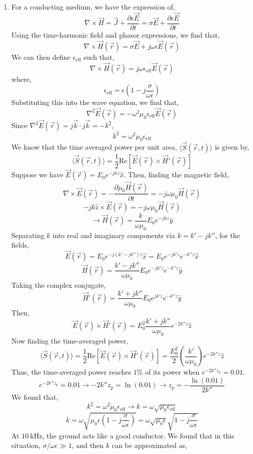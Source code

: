 \documentclass[12pt]{article}
\begin{document}
\begin{enumerate}
\begin{enumerate}
		\item [b.]
		For a conducting medium, we have the expression of,
		\[\nabla \times \vec H = \vec J + \frac{\partial \epsilon \vec E}{\partial t}=\sigma \vec E +\frac{\partial \epsilon \vec E}{\partial t}\]
		Using the time-harmonic field and phasor expressions, we find that,
		\[\nabla \times \vec H(\vec r) = \sigma \vec E + j\omega \epsilon \vec E(\vec r)\]
		We can then define $\epsilon_{\mathrm{eff}}$ such that,
		\[\nabla \times \vec H(\vec r) = j\omega \epsilon_{\mathrm{eff}}\vec E(\vec r)\]
		where,
		\[\epsilon_{\mathrm{eff}}=\epsilon\left(1-j\frac{\sigma}{\omega \epsilon}\right)\]
		Substituting this into the wave equation, we find that,
		\[\nabla^2 \vec E(\vec r)=-\omega^2\mu_0\epsilon_{\mathrm{eff}}\vec E(\vec r)\]
		Since $\nabla^2 \vec E(\vec r)=j\vec k \cdot j\vec k = -k^2$,
		\[k^2=\omega^2\mu_0\epsilon_{\mathrm{eff}}\]
		We know that the time averaged power per unit area, $\langle \vec S(\vec r, t)\rangle$ is given by,
		\[\langle \vec S(\vec r, t)\rangle = \frac{1}{2}\mathrm{Re}\left[\vec E(\vec r)\times \vec H'(\vec r)\right]\]
		Suppose we have $\vec E(\vec r)=E_0e^{-jkz}\hat x$.
		Then, finding the magnetic field,
		\[\nabla \times \vec E(\vec r) = -\frac{\partial \mu_0 \vec H(\vec r)}{\partial t}=-j\omega \mu_0 \vec H(\vec r)\]
		\[-jk\hat z \times \vec E(\vec r)=-j\omega \mu_0\vec H(\vec r)\]
		\[\to \vec H(\vec r)=\frac{k}{\omega \mu_0}E_0e^{-jkz}\hat y\]
		Separating $k$ into real and imaginary components via $k=k'-jk''$, for the fields,
		\[\vec E(\vec r)=E_0e^{-j(k'-jk'')z}\hat x=E_0e^{-jk'z}e^{-k''z}\hat x\]
		\[\vec H(\vec r)=\frac{k'-jk''}{\omega \mu_0}E_0e^{-jk'z}e^{-k''z}\hat y\]
		Taking the complex conjugate,
		\[\vec H'(\vec r)=\frac{k'+jk''}{\omega\mu_0}E_0e^{jk'z}e^{-k''z}\hat y\]
		Then,
		\[\vec E(\vec r)\times \vec H'(\vec r)=E_0^2\frac{k'+jk''}{\omega \mu_0}e^{-2k''z}\hat z\]
		Now finding the time-averaged power,
		\[\langle \vec S(\vec r,t )\rangle = \frac{1}{2}\mathrm{Re}\left[\vec E(\vec r)\times \vec H'(\vec r)\right]=\frac{E_0^2}{2}\left(\frac{k'}{\omega\mu_0}\right)e^{-2k''z}\hat z\]
		Thus, the time-averaged power reaches $1\%$ of its power when $e^{-2k''z_p}=0.01$.
		\[e^{-2k''z_p}=0.01 \to -2k''z_p=\ln(0.01)\to z_p=-\frac{\ln(0.01)}{2k''}\]
		We found that,
		\[k^2=\omega^2\mu_0\epsilon_{\mathrm{eff}} \to k=\omega \sqrt{\mu_0\epsilon_{\mathrm{eff}}}\]
		\[k=\omega\sqrt{\mu_0\epsilon\left(1-j\frac{\sigma}{\omega \epsilon}\right)}=\omega\sqrt{\mu_0\epsilon}\sqrt{1-j\frac{\sigma}{\omega \epsilon}}\]
		At $10\:\mathrm{kHz}$, the ground acts like a good conductor.
		We found that in this situation, $\sigma/\omega\epsilon \gg 1$, and then $k$ can be approximated as,

\end{enumerate}
\end{enumerate}
\end{document}
